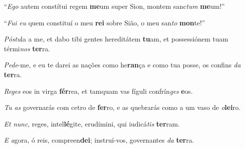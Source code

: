 \begin{greenumerate}
  \setcounter{enumi}{1}


  \item ``\textit{Ego} autem constítui regem \textbf{me}um {\GreStar} super Sion, montem sanc\textit{tum} \textbf{me}um!'' 

  \switchcolumn\setcounter{enumi}{1}

  \item ``\textit{Fui eu} quem constituí o meu \textbf{rei} {\GreStar} sobre Sião, o meu san\textit{to} \textbf{mon}te!'' 

  \switchcolumn*


  \item \textit{Póstu}la a me, et dabo tibi gentes hereditátem \textbf{tu}am, {\GreStar}et possessiónem tuam térmi\textit{nos} \textbf{ter}ra. 

  \switchcolumn%

  \item \textit{Pede}-me, e eu te darei as nações como he\textbf{ran}ça {\GreStar} e como tua posse, os confins \textit{da} \textbf{ter}ra. 

  \switchcolumn*


  \item \textit{Reges} eos in virga \textbf{fér}rea, {\GreStar} et tamquam vas fíguli confrín\textit{ges} \textbf{e}os. 

  \switchcolumn%

  \item \textit{Tu as} governarás com cetro de \textbf{fer}ro, {\GreStar} e as quebrarás como a um vaso de \textit{o}\textbf{lei}ro. 

  \switchcolumn*


  \item \textit{Et nunc}, reges, intel\textbf{lé}gite, {\GreStar} erudímini, qui iudicá\textit{tis} \textbf{ter}ram. 

  \switchcolumn%

  \item \textit{E a}gora, ó reis, compreen\textbf{dei}; {\GreStar} instruí-vos, governantes \textit{da} \textbf{ter}ra. 


\end{greenumerate}
